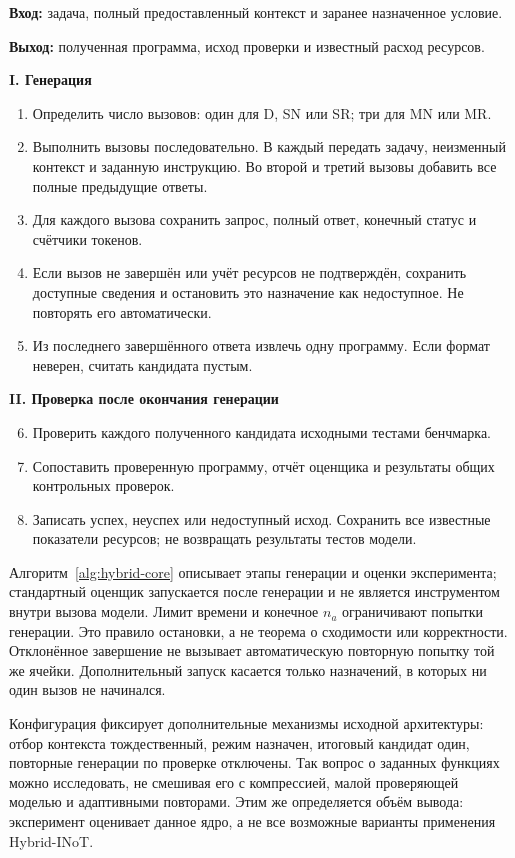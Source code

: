 \begin{algorithm}[htbp]
\caption{Генерация программы и проверка результата}
\label{alg:hybrid-core}
\small
\textbf{Вход:} задача, полный предоставленный контекст и заранее назначенное условие.\par
\textbf{Выход:} полученная программа, исход проверки и известный расход ресурсов.\par\medskip
\textbf{I. Генерация}
\begin{enumerate}\setlength{\itemsep}{2pt}\setlength{\parsep}{0pt}
\item Определить число вызовов: один для D, SN или SR; три для MN или MR.
\item Выполнить вызовы последовательно. В каждый передать задачу, неизменный контекст и заданную инструкцию. Во второй и третий вызовы добавить все полные предыдущие ответы.
\item Для каждого вызова сохранить запрос, полный ответ, конечный статус и счётчики токенов.
\item Если вызов не завершён или учёт ресурсов не подтверждён, сохранить доступные сведения и остановить это назначение как недоступное. Не повторять его автоматически.
\item Из последнего завершённого ответа извлечь одну программу. Если формат неверен, считать кандидата пустым.
\end{enumerate}
\textbf{II. Проверка после окончания генерации}
\begin{enumerate}\setcounter{enumi}{5}\setlength{\itemsep}{2pt}\setlength{\parsep}{0pt}
\item Проверить каждого полученного кандидата исходными тестами бенчмарка.
\item Сопоставить проверенную программу, отчёт оценщика и результаты общих контрольных проверок.
\item Записать успех, неуспех или недоступный исход. Сохранить все известные показатели ресурсов; не возвращать результаты тестов модели.
\end{enumerate}
\end{algorithm}

Алгоритм~\ref{alg:hybrid-core} описывает этапы генерации и оценки эксперимента; стандартный оценщик запускается после генерации и не является инструментом внутри вызова модели. Лимит времени и конечное $n_a$ ограничивают попытки генерации. Это правило остановки, а не теорема о сходимости или корректности. Отклонённое завершение не вызывает автоматическую повторную попытку той же ячейки. Дополнительный запуск касается только назначений, в которых ни один вызов не начинался.

Конфигурация фиксирует дополнительные механизмы исходной архитектуры: отбор контекста тождественный, режим назначен, итоговый кандидат один, повторные генерации по проверке отключены. Так вопрос о заданных функциях можно исследовать, не смешивая его с компрессией, малой проверяющей моделью и адаптивными повторами. Этим же определяется объём вывода: эксперимент оценивает данное ядро, а не все возможные варианты применения Hybrid-INoT.
